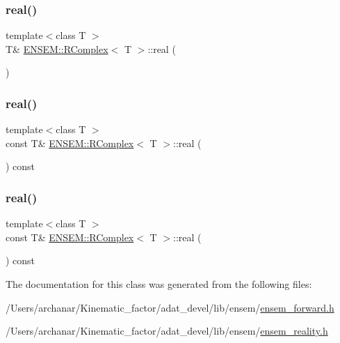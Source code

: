\subsubsection{\texorpdfstring{real()}{real()}\hspace{0.1cm}{\footnotesize\ttfamily [2/4]}}
{\footnotesize\ttfamily template$<$class T $>$ \\
T\& \mbox{\hyperlink{classENSEM_1_1RComplex}{E\+N\+S\+E\+M\+::\+R\+Complex}}$<$ T $>$\+::real (\begin{DoxyParamCaption}{ }\end{DoxyParamCaption})\hspace{0.3cm}{\ttfamily [inline]}}

\mbox{\label{classENSEM_1_1RComplex_a0a055b8b16ef4c73ab5fb4e5ff93c7f1}} 
\subsubsection{\texorpdfstring{real()}{real()}\hspace{0.1cm}{\footnotesize\ttfamily [3/4]}}
{\footnotesize\ttfamily template$<$class T $>$ \\
const T\& \mbox{\hyperlink{classENSEM_1_1RComplex}{E\+N\+S\+E\+M\+::\+R\+Complex}}$<$ T $>$\+::real (\begin{DoxyParamCaption}{ }\end{DoxyParamCaption}) const\hspace{0.3cm}{\ttfamily [inline]}}

\mbox{\label{classENSEM_1_1RComplex_a0a055b8b16ef4c73ab5fb4e5ff93c7f1}} 
\subsubsection{\texorpdfstring{real()}{real()}\hspace{0.1cm}{\footnotesize\ttfamily [4/4]}}
{\footnotesize\ttfamily template$<$class T $>$ \\
const T\& \mbox{\hyperlink{classENSEM_1_1RComplex}{E\+N\+S\+E\+M\+::\+R\+Complex}}$<$ T $>$\+::real (\begin{DoxyParamCaption}{ }\end{DoxyParamCaption}) const\hspace{0.3cm}{\ttfamily [inline]}}



The documentation for this class was generated from the following files\+:\begin{DoxyCompactItemize}
\item 
/\+Users/archanar/\+Kinematic\+\_\+factor/adat\+\_\+devel/lib/ensem/\mbox{\hyperlink{lib_2ensem_2ensem__forward_8h}{ensem\+\_\+forward.\+h}}\item 
/\+Users/archanar/\+Kinematic\+\_\+factor/adat\+\_\+devel/lib/ensem/\mbox{\hyperlink{lib_2ensem_2ensem__reality_8h}{ensem\+\_\+reality.\+h}}\end{DoxyCompactItemize}
